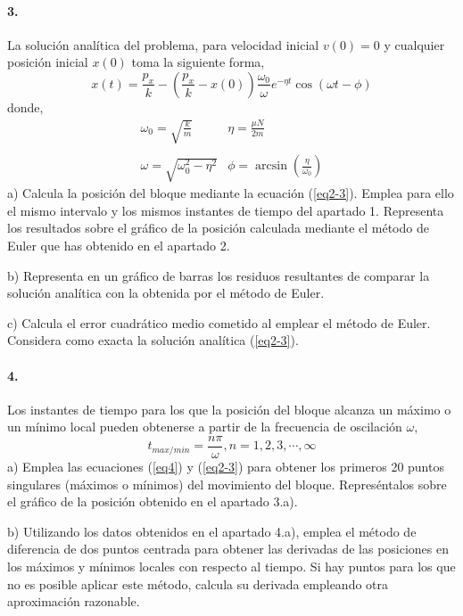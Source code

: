 \paragraph{3.} La solución analítica del problema, para velocidad inicial $v(0)=0$ y cualquier posición inicial $x(0)$ toma la siguiente forma,
\begin{equation}\label{eq2-3}
	x(t) = \frac{p_x}{k}-\left(\frac{p_x}{k}-x(0)\right)\frac{\omega_0}{\omega}e^{-\eta t}\cos\left(\omega t-\phi \right)
\end{equation}
donde,
\begin{equation}
\begin{matrix}
\omega_0 = \sqrt{\frac{k}{m}} & \eta = \frac{\mu N}{2m}\\
\ & \ \\
\omega = \sqrt{\omega_0^2 -\eta^2} &
\phi = \arcsin \left(\frac{\eta}{\omega_0}\right)
\end{matrix} \nonumber
\end{equation}
a) Calcula la posición del bloque mediante la ecuación (\ref{eq2-3}). Emplea para ello el mismo intervalo y los mismos instantes de tiempo del apartado 1. Representa los resultados sobre el gráfico de la posición calculada mediante el método de Euler que has obtenido en el apartado 2. 

b) Representa en un gráfico de barras los residuos resultantes de comparar la solución analítica con la obtenida por el método de Euler.

c) Calcula el error cuadrático medio cometido al emplear el método de Euler. Considera como exacta la solución analítica (\ref{eq2-3}).


\paragraph{4.} Los instantes de tiempo para los que la posición del bloque alcanza un máximo o un mínimo local pueden obtenerse a partir de la frecuencia de oscilación $\omega$,
\begin{equation}\label{eq4}
t_{max/min} = \frac{n \pi}{\omega}, n = 1,2,3,\cdots, \infty
\end{equation}
a) Emplea las ecuaciones (\ref{eq4}) y (\ref{eq2-3}) para obtener los primeros 20 puntos singulares (máximos o mínimos) del movimiento del bloque. Represéntalos sobre el gráfico de la posición obtenido en el apartado 3.a).

b) Utilizando los datos obtenidos en el apartado 4.a), emplea el método de diferencia de dos puntos centrada para obtener las derivadas de las posiciones en los máximos y mínimos locales con respecto al tiempo. Si hay puntos para los que no es posible aplicar este método, calcula su derivada empleando otra aproximación razonable.
 
